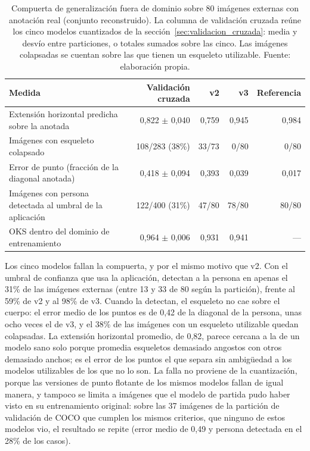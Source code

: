 \begin{table}[H]
\centering
\small
\renewcommand{\arraystretch}{1.3}
\begin{tabular}{|>{\raggedright\arraybackslash}p{}|r|r|r|r|}
\hline
\textbf{Medida} & \textbf{Validación cruzada} & \textbf{v2} & \textbf{v3} & \textbf{Referencia} \\
\hline
Extensión horizontal predicha sobre la anotada & 0,822 $\pm$ 0,040 & 0,759 & 0,945 & 0,984 \\
\hline
Imágenes con esqueleto colapsado & 108/283 (38\%) & 33/73 & 0/80 & 0/80 \\
\hline
Error de punto (fracción de la diagonal anotada) & 0,418 $\pm$ 0,094 & 0,393 & 0,039 & 0,017 \\
\hline
Imágenes con persona detectada al umbral de la aplicación & 122/400 (31\%) & 47/80 & 78/80 & 80/80 \\
\hline
OKS dentro del dominio de entrenamiento & 0,964 $\pm$ 0,006 & 0,931 & 0,941 & --- \\
\hline
\end{tabular}
\caption{Compuerta de generalización fuera de dominio sobre 80 imágenes externas con anotación real (conjunto reconstruido). La columna de validación cruzada reúne los cinco modelos cuantizados de la sección~\ref{sec:validacion_cruzada}: media y desvío entre particiones, o totales sumados sobre las cinco. Las imágenes colapsadas se cuentan sobre las que tienen un esqueleto utilizable. Fuente: elaboración propia.}
\label{tab:compuerta_validacion_cruzada}
\end{table}

Los cinco modelos fallan la compuerta, y por el mismo motivo que v2. Con el umbral de confianza que usa la aplicación, detectan a la persona en apenas el 31\% de las imágenes externas (entre 13 y 33 de 80 según la partición), frente al 59\% de v2 y al 98\% de v3. Cuando la detectan, el esqueleto no cae sobre el cuerpo: el error medio de los puntos es de 0,42 de la diagonal de la persona, unas ocho veces el de v3, y el 38\% de las imágenes con un esqueleto utilizable quedan colapsadas. La extensión horizontal promedio, de 0,82, parece cercana a la de un modelo sano solo porque promedia esqueletos demasiado angostos con otros demasiado anchos; es el error de los puntos el que separa sin ambigüedad a los modelos utilizables de los que no lo son. La falla no proviene de la cuantización, porque las versiones de punto flotante de los mismos modelos fallan de igual manera, y tampoco se limita a imágenes que el modelo de partida pudo haber visto en su entrenamiento original: sobre las 37 imágenes de la partición de validación de COCO que cumplen los mismos criterios, que ninguno de estos modelos vio, el resultado se repite (error medio de 0,49 y persona detectada en el 28\% de los casos).

